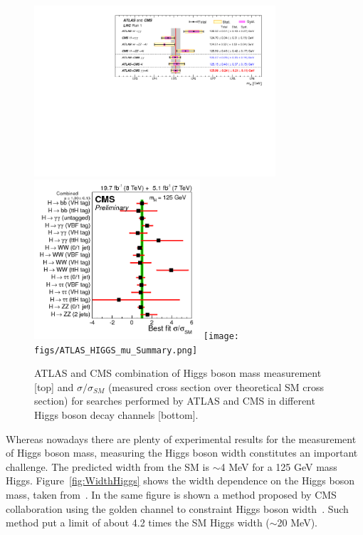 \begin{figure}[!Hhtbp]
  \begin{center}
    \includegraphics[trim=10cm 7cm 1cm 1cm, clip=true, width=0.8\textwidth]{figs/LHC_combined_obs_unblind_summary_a1_final.png}
    \includegraphics[width=0.55\textwidth]{figs/sqr_mlz_ccc_mH125.png}
    \texttt{[image: figs/ATLAS\_HIGGS\_mu\_Summary.png]}
    \caption{ATLAS and CMS combination of Higgs boson mass measurement [top] and $\sigma/\sigma_{SM}$ (measured cross section over theoretical SM cross section) for searches performed by ATLAS and CMS in different Higgs boson decay channels [bottom].}
    \label{fig:HiggsMass}
  \end{center}
\end{figure}

Whereas nowadays there are plenty of experimental results for the measurement of Higgs boson mass, measuring the Higgs boson width constitutes an important challenge. The predicted width from the SM is $\sim$4 MeV for a 125 GeV mass Higgs. Figure~\ref{fig:WidthHiggs} shows the width dependence on the Higgs boson mass, taken from~\cite{Dittmaier:2011ti, Dittmaier:2012vm, Heinemeyer:2013tqa, HIGGSXSWG}. In the same figure is shown a method proposed by CMS collaboration using the golden channel to constraint Higgs boson width~\cite{Khachatryan:2014iha}. Such method put a limit of about 4.2 times the SM Higgs width ($\sim$20 MeV).

